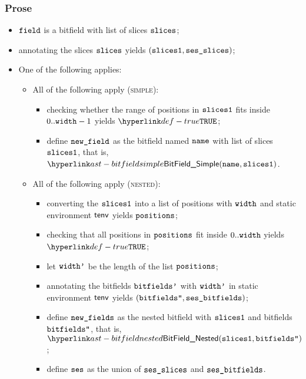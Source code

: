 \subsubsection{Prose}
\begin{itemize}
  \item $\texttt{field}$ is a bitfield with list of slices $\texttt{slices}$;
  \item annotating the slices $\texttt{slices}$ yields $(\texttt{slices1}, \texttt{ses\_slices})$\ProseOrTypeError;
  \item One of the following applies:
  \begin{itemize}
    \item All of the following apply (\textsc{simple}):
    \begin{itemize}
      \item checking whether the range of positions in $\texttt{slices1}$ fits inside $0..\texttt{width}-1$ yields $\True$\ProseOrTypeError;
      \item define $\texttt{new\_field}$ as the bitfield named $\texttt{name}$ with list of slices $\texttt{slices1}$, that is, $\BitFieldSimple(\name, \slicesone)$.
    \end{itemize}

    \item All of the following apply (\textsc{nested}):
    \begin{itemize}
      \item converting the $\texttt{slices1}$ into a list of positions with $\texttt{width}$ and static environment $\textsf{tenv}$
            yields $\texttt{positions}$\ProseOrTypeError;
      \item checking that all positions in $\texttt{positions}$ fit inside $0..\texttt{width}$ yields \\
            $\True$\ProseOrTypeError;
      \item let $\texttt{width'}$ be the length of the list $\texttt{positions}$;
      \item annotating the bitfields $\texttt{bitfields'}$ with $\texttt{width'}$ in static environment $\textsf{tenv}$ yields $ (\texttt{bitfields''}, \texttt{ses\_bitfields})$\ProseOrTypeError;
      \item define $\texttt{new\_fields}$ as the nested bitfield with $\texttt{slices1}$ and bitfields \\
            $\texttt{bitfields''}$, that is, $\BitFieldNested(\slicesone, \bitfieldspp)$;
      \item define $\texttt{ses}$ as the union of $\texttt{ses\_slices}$ and $\texttt{ses\_bitfields}$.
    \end{itemize}


\end{itemize}
\end{itemize}
